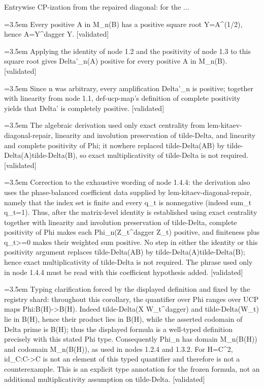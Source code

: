 \documentclass{article}
\newcommand{\step}[1]{\par\noindent\hangindent=3.5em\hangafter=1%
  \makebox[3.5em][l]{\textbf{#1.}}}
\newcommand{\steptag}[1]{\hfill{\small\textsf{[#1]}}}
\begin{document}
\begin{proofbox}{Entrywise CP-ization from the repaired diagonal: for the ...}
\step{1.4.1} Every positive A in M\_n(B) has a positive square root Y=A\textasciicircum{}(1/2), hence A=Y\textasciicircum{}dagger Y. \steptag{validated} \\[4pt]
\step{1.4.2} Applying the identity of node 1.2 and the positivity of node 1.3 to this square root gives Delta'\_n(A) positive for every positive A in M\_n(B). \steptag{validated} \\[4pt]
\step{1.4.3} Since n was arbitrary, every amplification Delta'\_n is positive; together with linearity from node 1.1, def-ucp-map's definition of complete positivity yields that Delta' is completely positive. \steptag{validated} \\[4pt]
\step{1.4.4} The algebraic derivation used only exact centrality from lem-kitaev-diagonal-repair, linearity and involution preservation of tilde-Delta, and linearity and complete positivity of Phi; it nowhere replaced tilde-Delta(AB) by tilde-Delta(A)tilde-Delta(B), so exact multiplicativity of tilde-Delta is not required. \steptag{validated} \\[6pt]
\step{1.4.4.1} Correction to the exhaustive wording of node 1.4.4: the derivation also uses the phase-balanced coefficient data supplied by lem-kitaev-diagonal-repair, namely that the index set is finite and every q\_t is nonnegative (indeed sum\_t q\_t=1). Thus, after the matrix-level identity is established using exact centrality together with linearity and involution preservation of tilde-Delta, complete positivity of Phi makes each Phi\_n(Z\_t\textasciicircum{}dagger Z\_t) positive, and finiteness plus q\_t>=0 makes their weighted sum positive. No step in either the identity or this positivity argument replaces tilde-Delta(AB) by tilde-Delta(A)tilde-Delta(B); hence exact multiplicativity of tilde-Delta is not required. The phrase used only in node 1.4.4 must be read with this coefficient hypothesis added. \steptag{validated} \\[4pt]
\step{1.5} Typing clarification forced by the displayed definition and fixed by the registry shard: throughout this corollary, the quantifier over Phi ranges over UCP maps Phi:B(H)->B(H). Indeed tilde-Delta(X W\_t\textasciicircum{}dagger) and tilde-Delta(W\_t) lie in B(H), hence their product lies in B(H), while the asserted codomain of Delta prime is B(H); thus the displayed formula is a well-typed definition precisely with this stated Phi type. Consequently Phi\_n has domain M\_n(B(H)) and codomain M\_n(B(H)), as used in nodes 1.2.4 and 1.3.2. For H=C\textasciicircum{}2, id\_C:C->C is not an element of this typed quantifier and therefore is not a counterexample. This is an explicit type annotation for the frozen formula, not an additional multiplicativity assumption on tilde-Delta. \steptag{validated} \\[4pt]
\end{proofbox}
\end{document}
